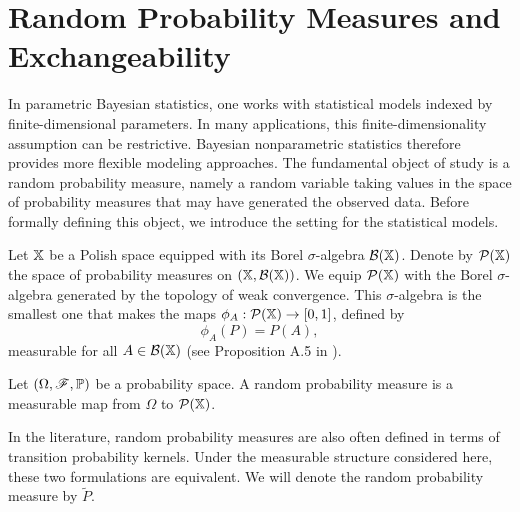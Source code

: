\section{Random Probability Measures and Exchangeability}\label{section:bnp_toolbox_rpm_and_exchangeability}

In parametric Bayesian statistics, one works with statistical models indexed by finite-dimensional parameters. In many applications, this finite-dimensionality assumption can be restrictive. Bayesian nonparametric statistics therefore provides more flexible modeling approaches. The fundamental object of study is a random probability measure, namely a random variable taking values in the space of probability measures that may have generated the observed data. Before formally defining this object, we introduce the setting for the statistical models.

Let $\mathbb{X}$ be a Polish space equipped with its Borel $\sigma$-algebra $\mathcal{B}(\mathbb{X})$. Denote by $\mathcal{P}(\mathbb{X})$ the space of probability measures on $(\mathbb{X},\mathcal{B}(\mathbb{X}))$. We equip $\mathcal{P}(\mathbb{X})$ with the Borel $\sigma$-algebra generated by the topology of weak convergence. This $\sigma$-algebra is the smallest one that makes the maps $\phi_A : \mathcal{P}(\mathbb{X}) \to [0,1]$, defined by
\[
\phi_A(P) = P(A),
\]
measurable for all $A \in \mathcal{B}(\mathbb{X})$ (see Proposition A.5 in \cite{ghosal2017fundamentals}).

\begin{definition}\label{definition:random_probability_measure}
Let $\left( \Omega, \mathscr{F}, \mathbb{P} \right)$ be a probability space. A random probability measure is a measurable map from $\Omega$ to $\mathcal{P}(\mathbb{X})$.
\end{definition}

In the literature, random probability measures are also often defined in terms of transition probability kernels. Under the measurable structure considered here, these two formulations are equivalent. We will denote the random probability measure by $\widetilde{P}.$

